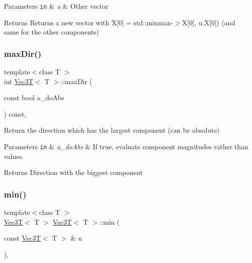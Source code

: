 \begin{DoxyParams}[1]{Parameters}
\mbox{\tt in}  & {\em u} & Other vector \\
\hline
\end{DoxyParams}
\begin{DoxyReturn}{Returns}
Returns a new vector with X\mbox{[}0\mbox{]} = std\+::minmax-\/$>$X\mbox{[}0\mbox{]}, u.\+X\mbox{[}0\mbox{]}) (and same for the other components) 
\end{DoxyReturn}
\mbox{\label{classVec3T_a292391c1f72ca66e100e7e70512ff9b1}} 
\subsubsection{\texorpdfstring{max\+Dir()}{maxDir()}}
{\footnotesize\ttfamily template$<$class T $>$ \\
int \hyperlink{classVec3T}{Vec3T}$<$ T $>$\+::max\+Dir (\begin{DoxyParamCaption}\item[{const bool}]{a\+\_\+do\+Abs }\end{DoxyParamCaption}) const\hspace{0.3cm}{\ttfamily [inline]}, {\ttfamily [noexcept]}}



Return the direction which has the largest component (can be absolute) 


\begin{DoxyParams}[1]{Parameters}
\mbox{\tt in}  & {\em a\+\_\+do\+Abs} & If true, evaluate component magnitudes rather than values. \\
\hline
\end{DoxyParams}
\begin{DoxyReturn}{Returns}
Direction with the biggest component 
\end{DoxyReturn}
\mbox{\label{classVec3T_ad0a0c9754ef8df1fa28abdaa01c246c4}} 
\subsubsection{\texorpdfstring{min()}{min()}}
{\footnotesize\ttfamily template$<$class T $>$ \\
\hyperlink{classVec3T}{Vec3T}$<$ T $>$ \hyperlink{classVec3T}{Vec3T}$<$ T $>$\+::min (\begin{DoxyParamCaption}\item[{const \hyperlink{classVec3T}{Vec3T}$<$ T $>$ \&}]{u }\end{DoxyParamCaption})\hspace{0.3cm}{\ttfamily [inline]}, {\ttfamily [noexcept]}}



